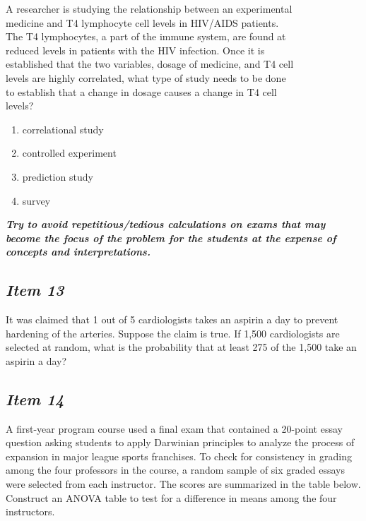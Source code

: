 A researcher is studying the relationship between an experimental \\ medicine and T4 lymphocyte cell levels in HIV/AIDS patients. \\ The T4 lymphocytes, a part of the immune system, are found at \\ reduced levels in patients with the HIV infection. Once it is \\ established that the two variables, dosage of medicine, and T4 cell \\ levels are highly correlated, what type of study needs to be done \\ to establish that a change in dosage causes a change in T4 cell \\levels? 
\begin{enumerate} [leftmargin=2cm, itemsep=.2em]
\item correlational study
\item controlled experiment
\item prediction study
\item survey
\end{enumerate}

\noindent\textbf{\textit{Try to avoid repetitious/tedious calculations on exams that may become the focus of the problem for the students at the expense of concepts and interpretations.}}

\subsection{\textbf{\textit{Item 13}}}
It was claimed 
that 1 out of 5 cardiologists takes an aspirin a day to prevent hardening of the arteries.  Suppose the claim is true.  If 1,500 cardiologists are selected at random, what is the probability that at least 275 of the 1,500 take an aspirin a day? 

\subsection{\textbf{\textit{Item 14}}}

A first-year program course 
%
used a final exam that contained a 20-point essay question asking students to apply Darwinian principles to analyze the process of expansion in major league sports franchises.  To check for consistency in grading among the four professors in the course, a random sample of six graded essays were selected from each instructor.  The scores are summarized in the table below.  Construct an ANOVA table to test for a difference in means among the four instructors. 


